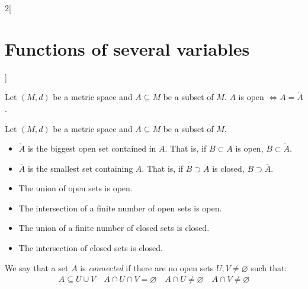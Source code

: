\documentclass[../../../main.tex]{subfiles}
\begin{document}
\begin{multicols}{2}[\section{Functions of several variables}]
  \begin{prop}
    Let $(M,d)$ be a metric space and $A\subseteq M$ be a subset of $M$. $A$ is open $\iff A=\mathring A$.
  \end{prop}
  \begin{prop}
    Let $(M,d)$ be a metric space and $A\subseteq M$ be a subset of $M$.
    \begin{itemize}
      \item $\mathring A$ is the biggest open set contained in $A$. That is, if $B\subset A$ is open, $B\subset\mathring A$.
      \item $\overline{A}$ is the smallest set containing $A$. That is, if $B\supset A$ is closed, $B\supset\overline{A}$.
    \end{itemize}
  \end{prop}
  \begin{prop}
    \hfill
    \begin{itemize}
      \item The union of open sets is open.
      \item The intersection of a finite number of open sets is open.
      \item The union of a finite number of closed sets is closed.
      \item The intersection of closed sets is closed.
    \end{itemize}
  \end{prop}
  \begin{definition}
    We say that a set $A$ is \textit{connected} if there are no open sets $U,V\ne\varnothing$ such that:
    \begin{gather*}
      A\subseteq U\cup V\quad A\cap U\cap V=\varnothing\quad A\cap U\ne\varnothing\quad A\cap V\ne\varnothing
    \end{gather*}
  \end{definition}

\end{multicols}
\end{document}
